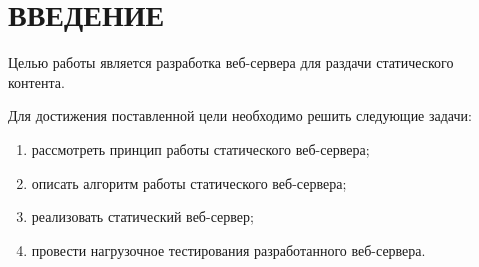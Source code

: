 \chapter*{ВВЕДЕНИЕ}

Целью работы является разработка веб-сервера для раздачи статического контента.

Для достижения поставленной цели необходимо решить следующие задачи:

\begin{enumerate}[label=\arabic*)]
	\item рассмотреть принцип работы статического веб-сервера;
	\item описать алгоритм работы статического веб-сервера;
	\item реализовать статический веб-сервер;
	\item провести нагрузочное тестирования разработанного веб-сервера.
\end{enumerate}